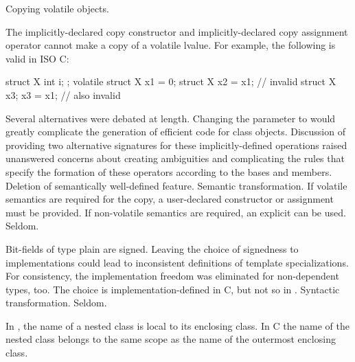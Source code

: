 \change
Copying volatile objects.

The implicitly-declared copy constructor and
implicitly-declared copy assignment operator
cannot make a copy of a volatile lvalue.
For example, the following is valid in ISO C:
\begin{codeblock}
struct X { int i; };
volatile struct X x1 = {0};
struct X x2 = x1;               // invalid \Cpp{}
struct X x3;
x3 = x1;                        // also invalid \Cpp{}
\end{codeblock}

\rationale
Several alternatives were debated at length.
Changing the parameter to
would greatly complicate the generation of
efficient code for class objects.
Discussion of
providing two alternative signatures for these
implicitly-defined operations raised
unanswered concerns about creating
ambiguities and complicating
the rules that specify the formation of
these operators according to the bases and
members.
\effect
Deletion of semantically well-defined feature.
\difficulty
Semantic transformation.
If volatile semantics are required for the copy,
a user-declared constructor or assignment must
be provided.
If non-volatile semantics are required,
an explicit
can be used.
\howwide
Seldom.

\change
{}%
Bit-fields of type plain  are signed.
\rationale
Leaving the choice of signedness to implementations could lead to
inconsistent definitions of template specializations. For consistency,
the implementation freedom was eliminated for non-dependent types,
too.
\effect
The choice is implementation-defined in C, but not so in \Cpp{}.
\difficulty
Syntactic transformation.
\howwide
Seldom.

\change
In \Cpp{}, the name of a nested class is local to its enclosing class. In C
the name of the nested class belongs to the same scope as the name of the outermost enclosing class.

